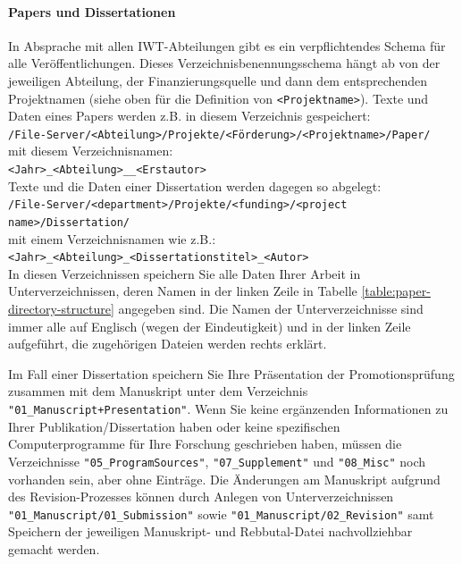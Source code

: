 \paragraph{Papers und Dissertationen}

\noindent In Absprache mit allen IWT-Abteilungen gibt es ein verpflichtendes Schema für alle Veröffentlichungen. Dieses Verzeichnisbenennungsschema hängt ab von der jeweiligen Abteilung, der Finanzierungsquelle und dann dem entsprechenden Projektnamen (siehe oben für die Definition von \texttt{<Projektname>}). Texte und Daten eines Papers werden z.B. in diesem Verzeichnis gespeichert:\\
\texttt{/File-Server/<Abteilung>/Projekte/<Förderung>/<Projektname>/Paper/} \\
mit diesem Verzeichnisnamen:
\\
\texttt{<Jahr>\_<Abteilung>\_<Paper-Name>\_<Erstautor> } \\


Texte und die Daten einer Dissertation werden dagegen so
abgelegt:
\\
\texttt{/File-Server/<department>/Projekte/<funding>/<project name>/Dissertation/} \\
mit einem Verzeichnisnamen wie z.B.:
\\
\texttt{<Jahr>\_<Abteilung>\_<Dissertationstitel>\_<Autor>} \\
In diesen Verzeichnissen speichern Sie alle Daten Ihrer Arbeit in
Unterverzeichnissen, deren Namen in der linken Zeile in
Tabelle \ref{table:paper-directory-structure} angegeben sind. Die Namen
der Unterverzeichnisse sind immer alle auf Englisch (wegen der Eindeutigkeit)
und in der linken Zeile aufgeführt, die zugehörigen Dateien werden rechts
erklärt.

Im Fall einer Dissertation speichern Sie Ihre Präsentation der Promotionsprüfung zusammen mit dem Manuskript unter dem Verzeichnis \texttt{"01\_Manuscript+Presentation"}. Wenn Sie keine ergänzenden Informationen zu Ihrer Publikation/Dissertation haben oder keine spezifischen Computerprogramme für Ihre Forschung geschrieben haben, müssen die Verzeichnisse \linebreak
\texttt{"05\_ProgramSources"}, \texttt{"07\_Supplement"} und \texttt{"08\_Misc"} noch vorhanden sein, aber ohne Einträge. Die Änderungen am Manuskript aufgrund des Revision-Prozesses können durch Anlegen von Unterverzeichnissen \texttt{"01\_Manuscript/01\_Submission"} sowie \linebreak
\texttt{"01\_Manuscript/02\_Revision"} samt Speichern der jeweiligen Manuskript- und Rebbutal-Datei nachvollziehbar gemacht werden.


